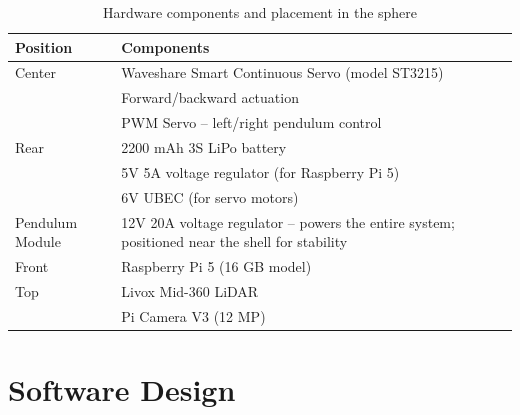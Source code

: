\documentclass[english, bachelor, utf8]{base/thesis_telematics}
\begin{document}
\begin{table}
\centering
\caption{Hardware components and placement in the sphere}
\label{tab:hardware_components_actuated}
\begin{tabularx}{\linewidth}{@{}l X@{}}
\toprule
\textbf{Position} & \textbf{Components} \\
\midrule
Center & Waveshare Smart Continuous Servo (model ST3215) \\
       & Forward/backward actuation \\
       & PWM Servo – left/right pendulum control \\
Rear   & 2200 mAh 3S LiPo battery \\
       & 5V 5A voltage regulator (for Raspberry Pi 5) \\
       & 6V UBEC (for servo motors) \\
Pendulum Module & 12V 20A voltage regulator – powers the entire system; positioned near the shell for stability \\
Front  & Raspberry Pi 5 (16 GB model) \\
Top    & Livox Mid-360 LiDAR \\
       & Pi Camera V3 (12 MP) \\
\bottomrule
\end{tabularx}
\vspace{-4mm}
\end{table}



\chapter{Software Design}
\end{document}

